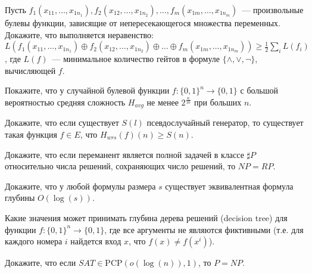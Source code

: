 \setcounter{curtask}{15}



\begin{task}
    Пусть $f_1(x_{1 1}, \dots, x_{1 n_1}), f_2(x_{1 2}, \dots, x_{1 n_2}), \dots, f_m(x_{1 m}, \dots, x_{1 n_m})$~--- произвольные
    булевы функции, зависящие от непересекающегося множества переменных. Докажите, что выполняется неравенство:
    $L(f_1(x_{1 1}, \dots, x_{1 n_1}) \oplus f_2(x_{1 2}, \dots, x_{1 n_2}) \oplus \dots \oplus f_m(x_{1 m}, \dots, x_{1 n_m}))
    \ge \frac{1}{2} \sum\limits_{i} L(f_i)$, где $L(f)$~--- минимальное количество гейтов в формуле $\{\land, \lor, \neg\}$,
    вычисляющей $f$.
\end{task}

\begin{task}
    Покажите, что у случайной булевой функции $f: \{0, 1\}^n \rightarrow \{0, 1\}$ с большой вероятностью средняя сложность
    $H_{avg}$ не менее $2^{\frac{n}{10}}$ при больших $n$.
\end{task}

\begin{task}
    Докажите, что если существует $S(l)$ псевдослучайный генератор, то существует такая функция $f \in E$, что $H_{wrs}(f)(n) \ge
    S(n)$.
\end{task}

\begin{task}
    Докажите, что если переманент является полной задачей в классе $\sharp P$ относительно числа решений, сохраняющих число
    решений, то $NP = RP$.
\end{task}


\breakline


\begin{ptask}{9}
    Докажите, что у любой формулы размера $s$ существует эквивалентная формула глубины $O(\log(s))$.
\end{ptask}

\begin{ptask}{10}
    Какие значения может принимать глубина дерева решений (decision tree) для функции $f: \{0, 1\}^n \rightarrow \{0, 1\}$, где
    все аргументы не являются фиктивными (т.е. для каждого номера $i$ найдется вход $x$, что $f(x) \neq f(x^{i})$).
\end{ptask}

\begin{ptask}{14}
    Докажите, что если $SAT \in \mathrm{PCP}(o(\log(n)), 1)$, то $P = NP$.
\end{ptask}

